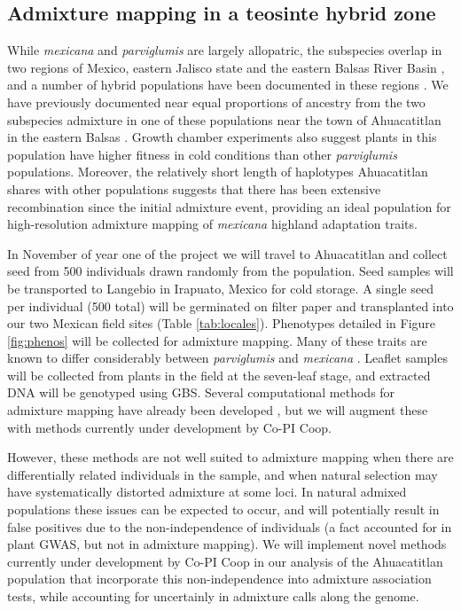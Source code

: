 \subsection{Admixture mapping in a teosinte hybrid zone} \label{subsec:admixmap}
While \emph{mexicana} and \emph{parviglumis} are largely allopatric, the subspecies overlap in two regions of Mexico, eastern Jalisco state and the eastern Balsas River Basin \citep{hufford2012inferences}, and a number of hybrid populations have been documented in these regions \citep{Fukunaga2005}.  We have previously documented near equal proportions of ancestry from the two subspecies   admixture in one of these populations near the town of Ahuacatitlan in the eastern Balsas \citep{Pyhajarvi2013}.  Growth chamber experiments also suggest plants in this population have higher fitness in cold conditions than other \emph{parviglumis} populations.  Moreover, the relatively short length of  haplotypes Ahuacatitlan shares with other  populations suggests that there has been extensive recombination since the initial admixture event, providing an ideal population for high-resolution admixture mapping of \emph{mexicana} highland adaptation traits.

In November of year one of the project we will travel to Ahuacatitlan and collect seed from 500 individuals drawn randomly from the population.  Seed samples will be transported to Langebio in Irapuato, Mexico for cold storage. A single seed per individual (500 total) will be germinated on filter paper and transplanted into our two Mexican field sites (Table \ref{tab:locales}).  Phenotypes detailed in Figure \ref{fig:phenos} will be collected for admixture mapping.  Many of these traits are known to differ considerably between \emph{parviglumis} and \emph{mexicana} \citep{wilkes1967teosinte}.  Leaflet samples will be collected from plants in the field at the seven-leaf stage, and extracted DNA will be genotyped using GBS.  Several computational methods for admixture mapping have already been developed \citep{winkler2010admixture}, but we will augment these with methods currently under development by Co-PI Coop.  

However, these methods are not well suited to admixture mapping when there are differentially related individuals in the sample, and when natural selection may have systematically distorted admixture at some loci. In natural admixed populations these issues can be expected to occur, and will potentially result in false positives due to the non-independence of individuals (a fact accounted for in plant GWAS, but not in admixture mapping). We will implement novel methods currently under development by Co-PI Coop in our analysis of the Ahuacatitlan population that incorporate this non-independence into admixture association tests, while accounting for uncertainly in admixture calls along the genome. 

